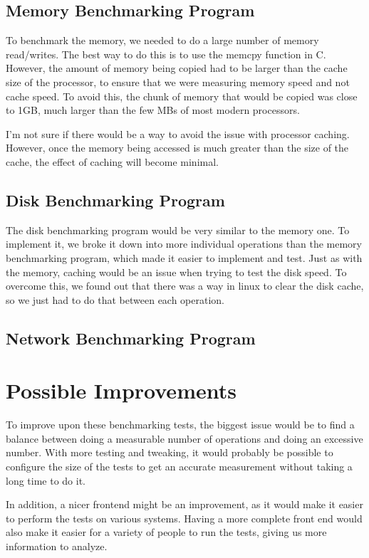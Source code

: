 \documentclass{article}
\begin{document}
\subsection{Memory Benchmarking Program}
To benchmark the memory, we needed to do a large number of memory read/writes.  The best way to do this is to use the memcpy function in C.  However, the amount of memory being copied had to be larger than the cache size of the processor, to ensure that we were measuring memory speed and not cache speed.  To avoid this, the chunk of memory that would be copied was close to 1GB, much larger than the few MBs of most modern processors.

I'm not sure if there would be a way to avoid the issue with processor caching.  However, once the memory being accessed is much greater than the size of the cache, the effect of caching will become minimal.

\subsection{Disk Benchmarking Program}
The disk benchmarking program would be very similar to the memory one.  To implement it, we broke it down into more individual operations than the memory benchmarking program, which made it easier to implement and test.  Just as with the memory, caching would be an issue when trying to test the disk speed.  To overcome this, we found out that there was a way in linux to clear the disk cache, so we just had to do that between each operation.

\subsection{Network Benchmarking Program}

\section{Possible Improvements}
To improve upon these benchmarking tests, the biggest issue would be to find a balance between doing a measurable number of operations and doing an excessive number.  With more testing and tweaking, it would probably be possible to configure the size of the tests to get an accurate measurement without taking a long time to do it.

In addition, a nicer frontend might be an improvement, as it would make it easier to perform the tests on various systems.  Having a more complete front end would also make it easier for a variety of people to run the tests, giving us more information to analyze.
\end{document}

